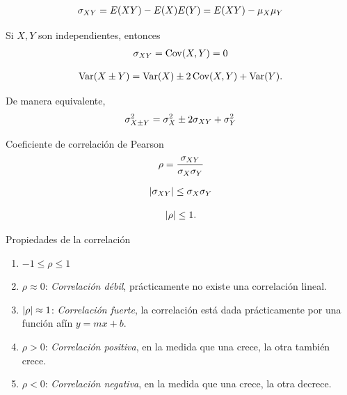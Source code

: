  \begin{align}
  \label{eq:3.50}
  \sigma_{XY}=E(XY)-E(X)E(Y)=E(XY)-\mu_{X}\mu_{Y}
 \end{align}


 Si $X,Y$ son independientes, entonces
 \begin{align}
  \label{eq:3.50}
  \sigma_{XY}=\operatorname{Cov}(X,Y)=0
 \end{align}



 \begin{align}
  \label{eq:3.51}
  \operatorname{Var}(X\pm Y)=\operatorname{Var}(X)\pm2\operatorname{Cov}(X,Y)+\operatorname{Var}(Y).
 \end{align}




 De manera equivalente,
 \begin{align}
  \label{eq:3.52}
  \sigma_{X\pm Y}^{2}=\sigma_{X}^{2} \pm 2\sigma_{XY} +\sigma_{Y}^{2}
 \end{align}


{Coeficiente de correlación de Pearson}
 \begin{align}
  \label{eq:3.54}
  \rho = \dfrac{\sigma_{XY}}{\sigma_{X}\sigma_{Y}}
 \end{align}



 \begin{teorema}
  \begin{align}
   \label{eq:3.53}
   \left|\sigma_{XY}\right|\leq \sigma_{X}\sigma_{Y}
  \end{align}


 \begin{align}
  \left|\rho\right|\leq 1.
 \end{align}
 \end{teorema}


{Propiedades de la correlación}

\begin{enumerate}
\item $-1 \leq \rho \leq 1$ 
 \item $\rho \approx 0$: \emph{Correlación débil}, prácticamente no existe una correlación lineal. 
 \item $\left|\rho\right| \approx 1$:\emph{ Correlación fuerte}, la correlación está dada prácticamente por una función afín $y=mx+b$. 
 \item $\rho > 0$: \emph{Correlación positiva}, en la medida que una crece, la otra también crece. 
 \item $\rho < 0$: \emph{Correlación negativa}, en la medida que una crece, la otra decrece.
\end{enumerate}



